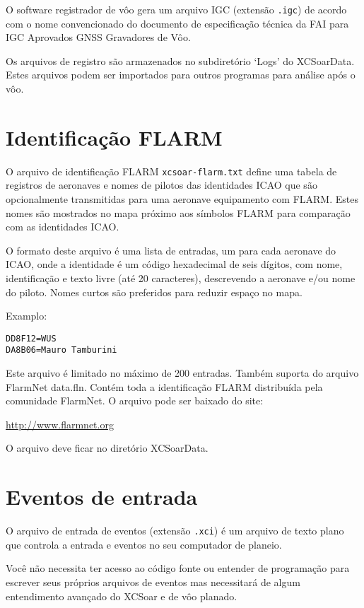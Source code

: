 O software registrador de vôo gera um arquivo IGC (extensão  \verb|.igc|) de acordo com o nome convencionado do documento de especificação técnica da FAI para IGC Aprovados GNSS Gravadores de Vôo.

Os arquivos de registro são armazenados no subdiretório ‘Logs’ do XCSoarData.  Estes arquivos podem ser importados para outros programas para análise após o vôo.


\section{Identificação FLARM}\label{sec:flarm-ident-file}

O arquivo de identificação FLARM \verb|xcsoar-flarm.txt| define uma tabela de registros de aeronaves e nomes de pilotos das identidades ICAO que são opcionalmente transmitidas para uma aeronave equipamento com FLARM.  Estes nomes são mostrados no mapa próximo aos símbolos FLARM para comparação com as identidades ICAO.

O formato deste arquivo é uma lista de entradas, um para cada aeronave do ICAO, onde a identidade é um código hexadecimal de seis dígitos, com nome, identificação e texto livre (até 20 caracteres), descrevendo a aeronave e/ou nome do piloto.  Nomes curtos são preferidos para reduzir espaço no mapa.

Examplo:
\begin{verbatim}
DD8F12=WUS
DA8B06=Mauro Tamburini
\end{verbatim}

Este arquivo é limitado no máximo de 200 entradas.  Também suporta do arquivo FlarmNet data.fln.  Contém toda a identificação FLARM distribuída pela comunidade FlarmNet.  O arquivo pode ser baixado do site:

\url{http://www.flarmnet.org}

O arquivo deve ficar no diretório  XCSoarData.


\section{Eventos de entrada}

O arquivo de entrada de eventos (extensão \verb|.xci|) é um arquivo de texto plano que controla a entrada e eventos no seu computador de planeio.

Você não necessita ter acesso ao código fonte ou entender de programação para escrever seus próprios arquivos de eventos mas necessitará de algum entendimento avançado do XCSoar e de vôo planado.

